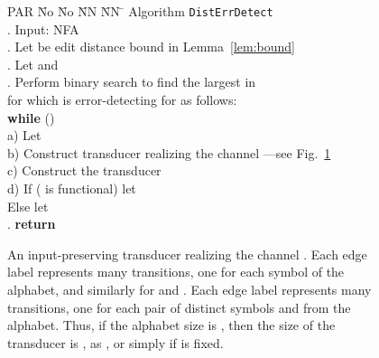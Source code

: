 \documentclass{article}
\theoremstyle{plain}
\theoremstyle{definition}
\theoremstyle{remark}
\begin{document}
\begin{figure}[ht]
\begin{tabbing}
PAR \= No \= No \= NN \= NN \=\kill
\> Algorithm \texttt{DistErrDetect} \\
.\> Input: NFA  \hspace{4mm} \\
.\> Let  be edit distance bound in Lemma~\ref{lem:bound}\\
.\> Let  and
 \\
.\> Perform binary search to find the largest  in
       \\
\>  \> for which  is error-detecting for  as follows: \\
\>  \>  \textbf{while} ()\\
\>  \>  a)\> Let \\
\>   \> b)\> Construct transducer  realizing the channel ---see Fig.~\ref{fig:inprestrans}\\
\>   \> c)\> Construct the transducer \\
\>   \> d)\> If ( is functional)  let \\
\>   \> \>  Else  let \\
. \> \textbf{return} 
\end{tabbing}
\end{figure}


\begin{figure}[ht]
\centering
{}
\parbox{4.3in}{\caption{An input-preserving transducer realizing the channel . Each edge label  represents many transitions, one for each symbol  of the alphabet, and similarly for  and . Each edge label  represents
many transitions, one for each pair of distinct symbols
 and  from the alphabet. Thus, if the alphabet size is , then the size of the transducer is , as , or simply  if  is fixed.}\label{fig:inprestrans}}
\end{figure}
\end{document}
